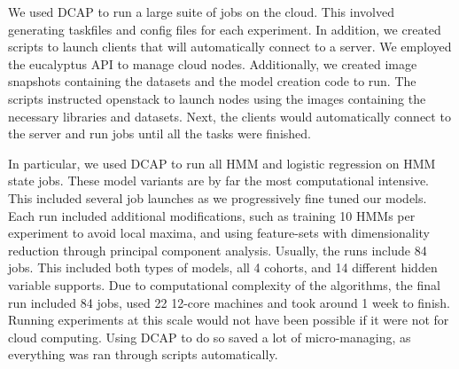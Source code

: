 We used DCAP to run a large suite of jobs on the cloud. This involved generating taskfiles and config files for each experiment. In addition, we created scripts to launch clients that will automatically connect to a server. We employed the eucalyptus API to manage cloud nodes. Additionally, we created image snapshots containing the datasets and the model creation code to run. The scripts instructed openstack to launch nodes using the images containing the necessary libraries and datasets. Next, the clients would automatically connect to the server and run jobs until all the tasks were finished.

In particular, we used DCAP to run all HMM and logistic regression on HMM state jobs. These model variants are by far the most computational intensive. This included several job launches as we progressively fine tuned our models. Each run included additional modifications, such as training 10 HMMs per experiment to avoid local maxima, and using feature-sets with dimensionality reduction through principal component analysis. Usually, the runs include 84 jobs. This included both types of models, all 4 cohorts, and 14 different hidden variable supports. Due to computational complexity of the algorithms, the final run included 84 jobs, used 22 12-core machines and took around 1 week to finish. Running experiments at this scale would not have been possible if it were not for cloud computing. Using DCAP to do so saved a lot of micro-managing, as everything was ran through scripts automatically.